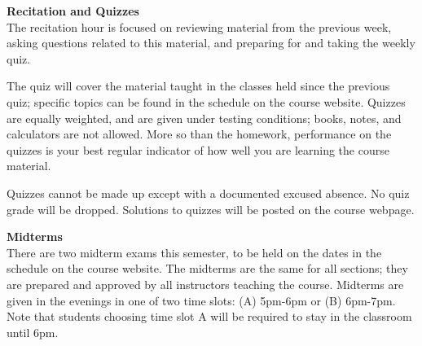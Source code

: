 \documentclass[12pt]{article}
\renewcommand{\emph}[1]{\textsf{\textbf{#1}}}
\newcommand{\localhead}[1]{\par\smallskip\textbf{#1}\nobreak\\}%
\def\heading#1{\localhead{\large\emph{#1}}}
\begin{document}







\heading{Recitation and Quizzes}
The recitation hour is focused on reviewing material from the previous week, asking questions related to this material, and preparing for and taking the weekly quiz.

The quiz will cover the material taught in the classes held since the previous quiz; specific topics can be found in the schedule on
the course website.  Quizzes are equally weighted, and are given under testing conditions; books, notes, and calculators are not allowed. More so than the homework, performance on the quizzes is your best regular indicator of how well you are learning the course material.

Quizzes cannot be made
up except with a documented excused absence. No quiz grade will be dropped. Solutions to quizzes will be posted on the course webpage.

\heading{Midterms}
There are two midterm exams this semester, to be held on the dates
in the schedule on the course website.  The midterms are the same 
for all sections; they are prepared and approved by all instructors teaching the course. Midterms are given in the evenings in one of two time slots: (A) 5pm-6pm or (B) 6pm-7pm. Note that students choosing time slot A will be required to stay in the classroom until 6pm.
\end{document}
